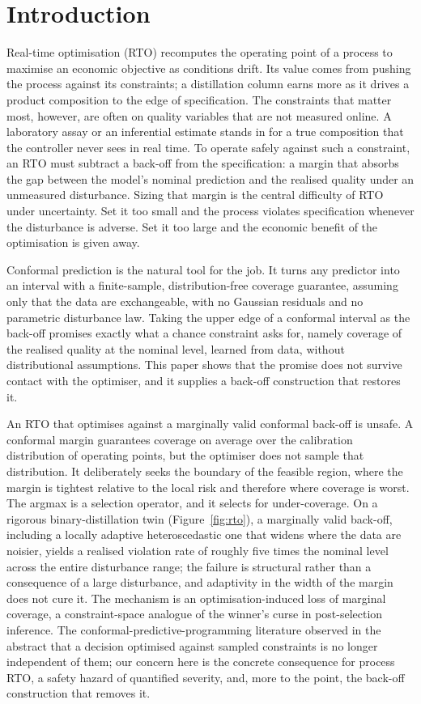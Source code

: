 \section{Introduction}
\label{sec:intro}

Real-time optimisation (RTO) recomputes the operating point of a process to maximise an
economic objective as conditions drift. Its value comes from pushing the process against
its constraints; a distillation column earns more as it drives a product composition to
the edge of specification. The constraints that matter most, however, are often on quality
variables that are not measured online. A laboratory assay or an inferential estimate
stands in for a true composition that the controller never sees in real time. To operate
safely against such a constraint, an RTO must subtract a back-off from the specification: a
margin that absorbs the gap between the model's nominal prediction and the realised quality
under an unmeasured disturbance. Sizing that margin is the central difficulty of RTO under
uncertainty. Set it too small and the process violates specification whenever the
disturbance is adverse. Set it too large and the economic benefit of the optimisation is
given away.

Conformal prediction is the natural tool for the job. It turns any predictor into an
interval with a finite-sample, distribution-free coverage guarantee, assuming only that the
data are exchangeable, with no Gaussian residuals and no parametric disturbance law. Taking
the upper edge of a conformal interval as the back-off promises exactly what a chance
constraint asks for, namely coverage of the realised quality at the nominal level, learned
from data, without distributional assumptions. This paper shows that the promise does not
survive contact with the optimiser, and it supplies a back-off construction that restores it.

An RTO that optimises against a marginally valid conformal back-off is unsafe. A conformal
margin guarantees coverage on average over the calibration distribution of operating points,
but the optimiser does not sample that distribution. It deliberately seeks the boundary of
the feasible region, where the margin is tightest relative to the local risk and therefore
where coverage is worst. The argmax is a selection operator, and it selects for
under-coverage. On a rigorous binary-distillation twin (Figure~\ref{fig:rto}), a marginally
valid back-off, including a locally adaptive heteroscedastic one that widens where the data
are noisier, yields a realised violation rate of roughly five times the nominal level across
the entire disturbance range; the failure is structural rather than a consequence of a large
disturbance, and adaptivity in the width of the margin does not cure it. The mechanism is an
optimisation-induced loss of marginal coverage, a constraint-space analogue of the winner's
curse in post-selection inference. The conformal-predictive-programming literature
\citep{zhao2024cpp} observed in the abstract that a decision optimised against sampled
constraints is no longer independent of them; our concern here is the concrete consequence
for process RTO, a safety hazard of quantified severity, and, more to the point, the back-off
construction that removes it.

